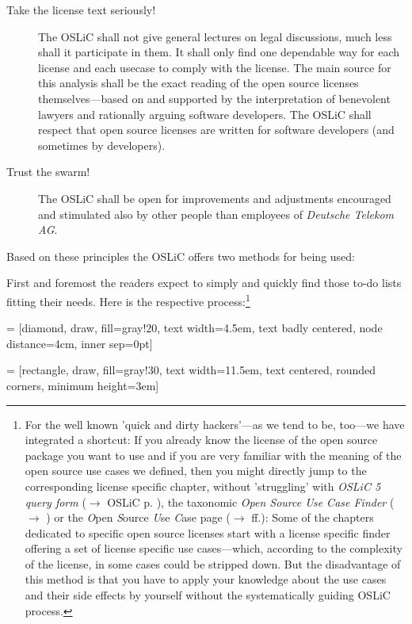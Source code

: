 \begin{description}
  \item[Take the license text seriously!] The OSLiC shall not give general
  lectures on legal discussions, much less shall it participate in them. It
  shall only find one dependable way for each license and each usecase to comply
  with the license. The main source for this analysis shall be the exact reading
  of the open source licenses themselves---based on and supported by the
  interpretation of benevolent lawyers and rationally arguing software
  developers. The OSLiC shall respect that open source licenses are written for
  software developers (and sometimes by developers).
  
  \item[Trust the swarm!] The OSLiC shall be open for improvements and
  adjustments encouraged and stimulated also by other people than employees of
  \emph{Deutsche Telekom AG}.
\end{description}

Based on these principles the OSLiC offers two methods for being used:

First and foremost the readers expect to simply and quickly find those to-do
lists fitting their needs. Here is the respective process:\footnote{For the well
known 'quick and dirty hackers'---as we tend to be, too---we have integrated a
shortcut: If you already know the license of the open source package you want to
use and if you are very familiar with the meaning of the open source use cases
we defined, then you might directly jump to the corresponding license specific
chapter, without 'struggling' with \textit{OSLiC 5 query form} ($\rightarrow$
OSLiC p. \pageref{OSLiCStandardFormForGatheringInformation}), the taxonomic
\textit{Open Source Use Case Finder} ($\rightarrow$
\pageref{OSLiCUseCaseFinder}) or the \textit{O}pen \textit{S}ource \textit{U}se
\textit{C}ase page ($\rightarrow$ \pageref{OSUCList}ff.): Some of the chapters
dedicated to specific open source licenses start with a license specific
finder offering a set of license specific use cases---which, according to the
complexity of the license, in some cases could be stripped down. But the
disadvantage of this method is that you have to apply your knowledge about the
use cases and their side effects by yourself without the systematically guiding
OSLiC process.}

 = [diamond, draw, fill=gray!20, 
    text width=4.5em, text badly centered, node distance=4cm, inner sep=0pt]

 = [rectangle, draw, fill=gray!30, 
    text width=11.5em, text centered, rounded corners, minimum height=3em]
 
